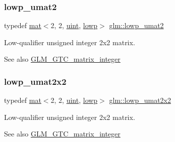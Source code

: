 \subsubsection{\texorpdfstring{lowp\+\_\+umat2}{lowp\_umat2}}
{\footnotesize\ttfamily typedef \mbox{\hyperlink{structglm_1_1mat}{mat}}$<$2, 2, \mbox{\hyperlink{group__core__precision_ga4fd29415871152bfb5abd588334147c8}{uint}}, \mbox{\hyperlink{namespaceglm_a36ed105b07c7746804d7fdc7cc90ff25ae161af3fc695e696ce3bf69f7332bc2d}{lowp}}$>$ \mbox{\hyperlink{group__gtc__matrix__integer_ga51cca2e9b98db6345e8c60b7d00c79cf}{glm\+::lowp\+\_\+umat2}}}

Low-\/qualifier unsigned integer 2x2 matrix. \begin{DoxySeeAlso}{See also}
\mbox{\hyperlink{group__gtc__matrix__integer}{G\+L\+M\+\_\+\+G\+T\+C\+\_\+matrix\+\_\+integer}} 
\end{DoxySeeAlso}
\mbox{\label{group__gtc__matrix__integer_gafbc94510f73d2a99348be30bda37a502}} 
\subsubsection{\texorpdfstring{lowp\+\_\+umat2x2}{lowp\_umat2x2}}
{\footnotesize\ttfamily typedef \mbox{\hyperlink{structglm_1_1mat}{mat}}$<$2, 2, \mbox{\hyperlink{group__core__precision_ga4fd29415871152bfb5abd588334147c8}{uint}}, \mbox{\hyperlink{namespaceglm_a36ed105b07c7746804d7fdc7cc90ff25ae161af3fc695e696ce3bf69f7332bc2d}{lowp}}$>$ \mbox{\hyperlink{group__gtc__matrix__integer_gafbc94510f73d2a99348be30bda37a502}{glm\+::lowp\+\_\+umat2x2}}}

Low-\/qualifier unsigned integer 2x2 matrix. \begin{DoxySeeAlso}{See also}
\mbox{\hyperlink{group__gtc__matrix__integer}{G\+L\+M\+\_\+\+G\+T\+C\+\_\+matrix\+\_\+integer}} 
\end{DoxySeeAlso}
\mbox{\label{group__gtc__matrix__integer_gafd5d32892f45c112f974b8d91fc4e25a}} 
